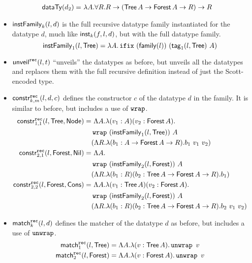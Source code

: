 \begin{itemize}
\begin{align*}
    \scottTy{d_2} =&\ \lambda A . \forall R . R \rightarrow (\Tree A \rightarrow \Forest A \rightarrow R) \rightarrow R
    \end{align*}
  \item $\dtInstFinal{l}{d}{k}$ is the full recursive datatype family
    instantiated for the datatype $d$, much like $\dtInst{f}{l}{d}{k}$, but
    with the full datatype family.
    $$\dtInstFinal{l}{\Tree}{1} = \lambda A . \ifix\  (\dtFamily{l})\ (\dtTag{l}{\Tree}{1}\ A)$$
  \item $\unveilRec{l}{t}$ ``unveils'' the datatypes as before, but
    unveils all the datatypes and replaces them with the full recursive
    definition instead of just the Scott-encoded type.
  \item $\constrRec{l}{d}{c}{k}{m}$ defines the constructor $c$ of the 
    datatype $d$ in the family. It is similar to before, but includes a use of $\wrap$.
    \begin{align*}
    \constrRec{l}{\Tree}{\Node}{1}{1} =&\ \Lambda A . \lambda (v_1 : A) (v_2 : \Forest A) .\\
                               &\wrap\  (\dtInstFinal{l}{\Tree}{1})\ A\\
                               &(\Lambda R . \lambda (b_1 : A \rightarrow \Forest A \rightarrow R) . b_1\ v_1\ v_2)\\
    \constrRec{l}{\Forest}{\NNil}{2}{1} =&\ \Lambda A . \\
                               &\wrap\  (\dtInstFinal{l}{\Forest}{2})\ A\\
                               &(\Lambda R . \lambda (b_1 : R) (b_2 : \Tree A \rightarrow \Forest A \rightarrow R) . b_1)\\
      \constrRec{l}{\Forest}{\CCons}{2}{2} =&\ \Lambda A . \lambda (v_1 : \Tree A) (v_2 : \Forest A) . \\
                               &\wrap\  (\dtInstFinal{l}{\Forest}{2})\ A\\
                               &(\Lambda R . \lambda (b_1 : R) (b_2 : \Tree A \rightarrow \Forest A \rightarrow R) . b_2\ v_1\ v_2)
    \end{align*}
  \item $\matchRec{l}{d}{k}$ defines the matcher of the datatype $d$ as
    before, but includes a use of $\unwrap$.
    \begin{align*}
    \matchRec{l}{\Tree}{1} &= \Lambda A . \lambda (v : \Tree A) . \unwrap\ v\\
    \matchRec{l}{\Forest}{2} &= \Lambda A . \lambda (v : \Forest A) . \unwrap\ v
    \end{align*}
\end{itemize}
